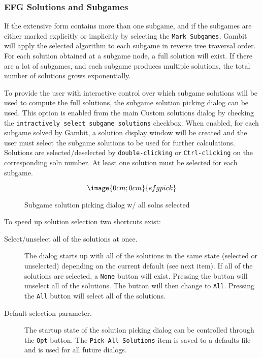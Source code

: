 {\subsubsection{EFG Solutions and Subgames}\label{EFGSolnSubg}
If the extensive form contains more than one subgame, and if the subgames are
either marked explicitly or implicitly by selecting the {\tt Mark Subgames}, 
Gambit will apply the 
selected algorithm to each subgame in reverse tree traversal order.  For each
solution obtained at a subgame node, a full solution will exist.  If there
are a lot of subgames, and each subgame produces multiple solutions, the 
total number of solutions grows exponentially.  

To provide the user with interactive control over 
which subgame solutions will be
used to compute the full solutions, the subgame solution picking dialog can 
be used.  This option is enabled from the main Custom solutions dialog by 
checking the {\tt intractively select subgame solutions} checkbox.
When enabled, for each subgame solved by Gambit, a solution display window
will be created and the user must select the subgame solutions to be used
for further calculations.  Solutions are selected/deselected 
by {\tt double-clicking} or {\tt Ctrl-clicking} on the corresponding soln number.  
At least one solution must be selected for each subgame.

\begin{figure}
$$\image{0cm;0cm}{efgpick}$$
\caption{Subgame solution picking dialog w/ all solns selected}\label{fig_efgpick}
\end{figure}

To speed up solution selection two shortcuts exist:

\begin{description}
\item[Select/unselect all of the solutions at once.]  The dialog starts up with
all of the solutions in the same state (selected or unselected) depending on
the current default (see next item).  If all of the solutions are selected,
a {\tt None} button will exist.  Pressing the button will unselect all of the
solutions.  The button will then change to {\tt All}.  Pressing the {\tt All} 
button will select all of the solutions.
\item[Default selection parameter.]  The startup state of the solution picking
dialog can be controlled through the {\tt Opt} button.  The {\tt Pick All Solutions} 
item is saved to a defaults file and is used for all future dialogs.
\end{description}

}
